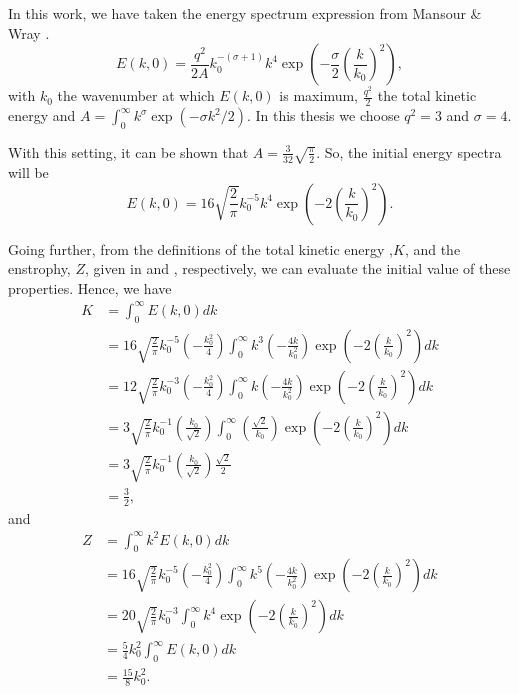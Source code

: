 In this work, we have taken the energy spectrum expression from Mansour \& Wray \cite{mansour_decay_1994}.
\begin{equation}
\label{eq-DHIT_init_spectrum}
E(k,0)=\frac{q^2}{2A}k_0^{-(\sigma+1)}k^4\exp\left(-\frac{\sigma}{2}\left(\frac{k}{k_0}\right)^2\right),
\end{equation}
with $k_0$ the wavenumber at which $E(k,0)$ is maximum, $\frac{q^2}{2}                                                                                                                                                                                                                  $ the total kinetic energy and $A=\int_0^\infty k^\sigma\exp(-\sigma k^2/2)$. In this thesis we choose $q^2=3$ and $\sigma=4$.

With this setting, it can be shown that $A=\frac{3}{32}\sqrt{\frac{\pi}{2}}$. So, the initial energy spectra will be
\begin{equation}
\label{eq-DHIT_init_spectrum2}
E(k,0)=16\sqrt{\frac{2}{\pi}}k_0^{-5}k^4\exp\left(-2\left(\frac{k}{k_0}\right)^2\right).
\end{equation}

Going further, from the definitions of the total kinetic energy ,$K$, and the enstrophy, $Z$, given in  and , respectively, we can evaluate the initial value of these properties. Hence, we have
\begin{align}
\label{eq-DHIT_intial_K}
K&=\int_0^\infty E(k,0)dk\\\nonumber
&=16\sqrt{\frac{2}{\pi}}k_0^{-5}\left(-\frac{k_0^2}{4}\right)\int_0^\infty k^3\left(-\frac{4k}{k_0^2}\right)\exp\left(-2\left(\frac{k}{k_0}\right)^2\right)dk\\\nonumber
&=12\sqrt{\frac{2}{\pi}}k_0^{-3}\left(-\frac{k_0^2}{4}\right)\int_0^\infty k\left(-\frac{4k}{k_0^2}\right)\exp\left(-2\left(\frac{k}{k_0}\right)^2\right)dk\\\nonumber
&=3\sqrt{\frac{2}{\pi}}k_0^{-1}\left(\frac{k_0}{\sqrt{2}}\right)\int_0^\infty\left(\frac{\sqrt{2}}{k_0}\right)\exp\left(-2\left(\frac{k}{k_0}\right)^2\right)dk\\\nonumber
&=3\sqrt{\frac{2}{\pi}}k_0^{-1}\left(\frac{k_0}{\sqrt{2}}\right)\frac{\sqrt{2}}{2}\\\nonumber
&=\frac{3}{2},
\end{align}
and
\begin{align}
\label{eq-DHIT_inital_Z}
Z&=\int_0^\infty k^2E(k,0)dk\\\nonumber
&=16\sqrt{\frac{2}{\pi}}k_0^{-5}\left(-\frac{k_0^2}{4}\right)\int_0^\infty k^5\left(-\frac{4k}{k_0^2}\right)\exp\left(-2\left(\frac{k}{k_0}\right)^2\right)dk\\\nonumber
&=20\sqrt{\frac{2}{\pi}}k_0^{-3}\int_0^\infty k^4\exp\left(-2\left(\frac{k}{k_0}\right)^2\right)dk\\\nonumber
&=\frac{5}{4}k_0^2\int_0^\infty E(k,0)dk\\\nonumber
&=\frac{15}{8}k_0^2.
\end{align}

